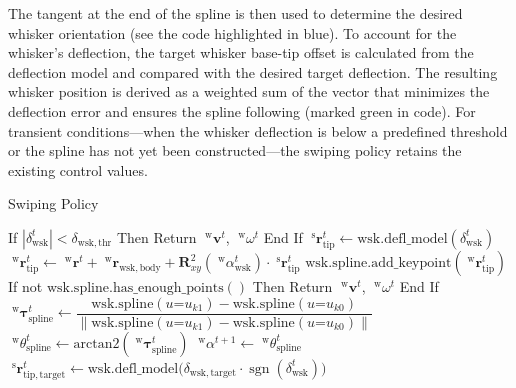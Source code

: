 The tangent at the end of the spline is then used to determine the desired whisker orientation (see the code highlighted in blue).
To account for the whisker's deflection, the target whisker base-tip offset is calculated from the deflection model and compared with the desired target deflection.
The resulting whisker position is derived as a weighted sum of the vector that minimizes the deflection error and ensures the spline following (marked green in code).
For transient conditions—when the whisker deflection is below a predefined threshold or the spline has not yet been constructed—the swiping policy retains the existing control values.

\begin{algorithm}[htb]
    \caption{Swiping Policy}
    \begin{algorithmic}[1]
        \State If \(|\delta_{\mathrm{wsk}}^{t}| < \delta_{\mathrm{wsk, thr}}\) Then 
        \State \quad Return \(\;^{\mathrm{w}}\boldsymbol{v}^{t}\), \(\;^{\mathrm{w}}\omega^{t}\)
        \State End If
        \State
        \State \colorbox{yellow!40}{\(\;^{\mathrm{s}}\boldsymbol{r}_{\mathrm{tip}}^{t} \gets \mathrm{wsk.defl\_model}(\delta_{\mathrm{wsk}}^{t})\)}
        \State \colorbox{yellow!40}{\(\;^{\mathrm{w}}\boldsymbol{r}_{\mathrm{tip}}^{t} \gets \;^{\mathrm{w}}\boldsymbol{r}^{t} + \;^{\mathrm{w}}\boldsymbol{r}_{\mathrm{wsk, body}} + \boldsymbol{R}_{xy}^{2}(\; ^{\mathrm{w}}\alpha_{\mathrm{wsk}}^{t}) \cdot \;^{\mathrm{s}}\boldsymbol{r}_{\mathrm{tip}}^{t}\)}
        \State \colorbox{yellow!40}{\(\mathrm{wsk.spline.add\_keypoint}(\;^{\mathrm{w}}\boldsymbol{r}_{\mathrm{tip}}^{t})\)}
        \State If not \(\mathrm{wsk.spline.has\_enough\_points()}\) Then 
        \State \quad Return \(\;^{\mathrm{w}}\boldsymbol{v}^{t}\), \(\;^{\mathrm{w}}\omega^{t}\)
        \State End If
        \State
        \State \colorbox{cyan!40}{\(\;^{\mathrm{w}}\boldsymbol{\tau}_{\mathrm{spline}}^{t} \gets \dfrac{\mathrm{wsk.spline}(u\mathord{=}u_{k1}) - \mathrm{wsk.spline}(u\mathord{=}u_{k0})}{\|\mathrm{wsk.spline}(u\mathord{=}u_{k1}) - \mathrm{wsk.spline}(u\mathord{=}u_{k0})\|}\)} 
        \State \colorbox{cyan!40}{\(\;^{\mathrm{w}}\theta_{\mathrm{spline}}^{t} \gets \mathrm{arctan2}(\;^{\mathrm{w}}\boldsymbol{\tau}_{\mathrm{spline}}^{t})\)} 
        \State \colorbox{cyan!40}{\(\;^{\mathrm{w}}\alpha^{t+1} \gets \;^{\mathrm{w}}\theta_{\mathrm{spline}}^{t}\)}
        \State \(\;^{\mathrm{s}}\boldsymbol{r}_{\mathrm{tip, target}}^{t} \gets \mathrm{wsk.defl\_model}\big(\delta_{\mathrm{wsk, target}} \cdot \operatorname{sgn}(\delta_{\mathrm{wsk}}^{t})\big)\) 

\end{algorithmic}
\end{algorithm}
